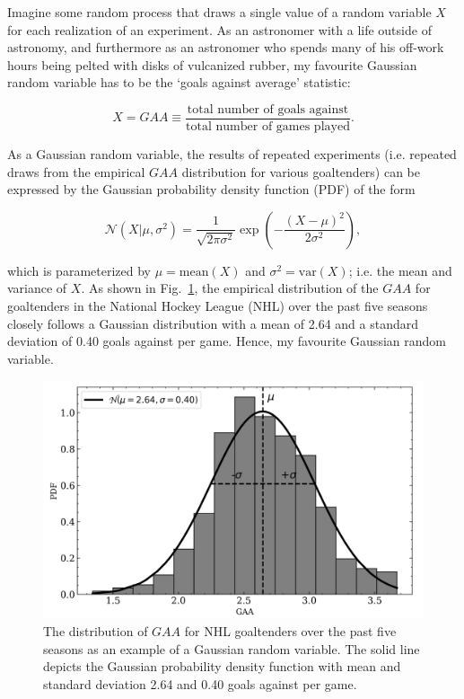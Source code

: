 Imagine some random
process that draws a single value of a random variable $X$ for each realization of
an experiment. As an astronomer with a life
outside of astronomy, and furthermore as an astronomer who spends many of his
off-work hours being pelted with %
disks of vulcanized rubber, my favourite
Gaussian random variable has to be the `goals against average' statistic:

\begin{equation}
  X = GAA \equiv \frac{\text{total number of goals against}}{\text{total number of games played}}.
\end{equation}

\noindent As a Gaussian random variable, the results of repeated experiments (i.e.
repeated draws from the empirical $GAA$ distribution for various goaltenders) can
be expressed by the Gaussian probability density function (PDF) of the form

\begin{equation}
  \mathcal{N}(X|\mu,\sigma^2) = \frac{1}{\sqrt{2\pi \sigma^2}} \exp{\left(
    -\frac{(X-\mu)^2}{2\sigma^2} \right)},
  \label{eq:gauss}
\end{equation}

\noindent which is parameterized by $\mu=\text{mean}(X)$ and $\sigma^2=\text{var}(X)$;
i.e. the mean and variance of $X$. As shown in Fig.~\ref{fig:gaa1d}, the empirical
distribution of the $GAA$ for goaltenders in
the National Hockey League (NHL) over the past five seasons closely follows a
Gaussian distribution with a mean of 2.64 and a standard deviation of 0.40 goals
against per game. Hence, my favourite Gaussian random variable. \\

\begin{figure}
  \centering
  \includegraphics[width=.8\textwidth]{figures/GAA1D.png}
  \caption[Gaussian random variable in one dimension.]
      {The distribution of $GAA$ for NHL goaltenders over the past five
    seasons as an example of a Gaussian random variable. The solid line depicts
    the Gaussian probability density function with mean and standard
    deviation 2.64 and 0.40 goals against per game.}
  \label{fig:gaa1d}
\end{figure}

